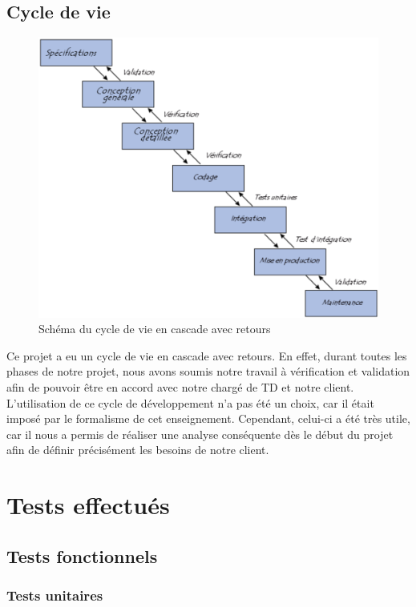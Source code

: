 \documentclass[17pts]{report}
\begin{document}
\section{Cycle de vie}
\label{sec:Cycle de vie}
\begin{figure}[H]
    \includegraphics[scale=0.7]{./illustrations/cycle_cascade.png}
    \centering
    \caption{Schéma du cycle de vie en cascade avec retours}
    \label{fig:CycleCascade}
\end{figure}

Ce projet a eu un cycle de vie en cascade avec retours. En effet, durant toutes
les phases de notre projet, nous avons soumis notre travail à vérification et
validation afin de pouvoir être en accord avec notre chargé de TD et notre
client. L'utilisation de ce cycle de développement n'a pas été un choix, car il
était imposé par le formalisme de cet enseignement. Cependant, celui-ci a été
très utile, car il nous a permis de réaliser une analyse conséquente dès le
début du projet afin de définir précisément les besoins de notre client.

\chapter{Tests effectués}
\label{cha:Tests}
\section{Tests fonctionnels}
\label{sec:Tests fonctionnels}
\subsection{Tests unitaires}
\label{sub:Tests unitaires}
\end{document}
